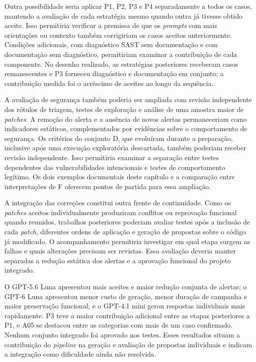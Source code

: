 Outra possibilidade seria aplicar P1, P2, P3 e P4 separadamente a todos os casos, mantendo a avaliação de cada estratégia mesmo quando outra já tivesse obtido aceite. Isso permitiria verificar a premissa de que os \textit{prompts} com mais orientações ou contexto também corrigiriam os casos aceitos anteriormente. Condições adicionais, com diagnóstico SAST sem documentação e com documentação sem diagnóstico, permitiriam examinar a contribuição de cada componente. No desenho realizado, as estratégias posteriores receberam casos remanescentes e P3 forneceu diagnóstico e documentação em conjunto; a contribuição medida foi o acréscimo de aceites ao longo da sequência.

A avaliação de segurança também poderia ser ampliada com revisão independente dos rótulos de triagem, testes de exploração e análise de uma amostra maior de \textit{patches}. A remoção do alerta e a ausência de novos alertas permaneceriam como indicadores estáticos, complementados por evidências sobre o comportamento de segurança. Os critérios do conjunto D, que evoluíram durante a preparação, inclusive após uma execução exploratória descartada, também poderiam receber revisão independente. Isso permitiria examinar a separação entre testes dependentes das vulnerabilidades intencionais e testes de comportamento legítimo. Os dois exemplos documentais deste capítulo e a comparação entre interpretações de F oferecem pontos de partida para essa ampliação.

A integração das correções constitui outra frente de continuidade. Como os \textit{patches} aceitos individualmente produziram conflitos ou reprovação funcional quando reunidos, trabalhos posteriores poderiam avaliar testes após a inclusão de cada \textit{patch}, diferentes ordens de aplicação e geração de propostas sobre o código já modificado. O acompanhamento permitiria investigar em qual etapa surgem as falhas e quais alterações precisam ser revistas. Essa avaliação deveria manter separadas a redução estática dos alertas e a aprovação funcional do projeto integrado.

O GPT-5.6 Luna apresentou mais aceites e maior redução conjunta de alertas; o GPT-6 Luna apresentou menor custo de geração, menor duração de campanha e maior preservação funcional; e o GPT-4.1 mini gerou respostas individuais mais rapidamente. P3 teve a maior contribuição adicional entre as etapas posteriores a P1, e A05 se destacou entre as categorias com mais de um caso confirmado. Nenhum conjunto integrado foi aprovado nos testes. Esses resultados situam a contribuição do \textit{pipeline} na geração e avaliação de propostas individuais e indicam a integração como dificuldade ainda não resolvida.
